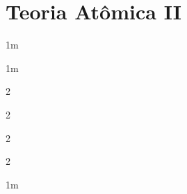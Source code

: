 \part{Teoria Atômica II}

\begin{multicols}{2}

    \begin{sectionBox}1m{}

    \end{sectionBox}

    \begin{sectionBox}1m{}



        \begin{sectionBox}2{}
        \end{sectionBox}

        \begin{sectionBox}2{}



        \end{sectionBox}

        \begin{sectionBox}2{}
        \end{sectionBox}

        \begin{sectionBox}2{}


        \end{sectionBox}

    \end{sectionBox}

    \begin{sectionBox}1m{}



\end{sectionBox}
\end{multicols}
